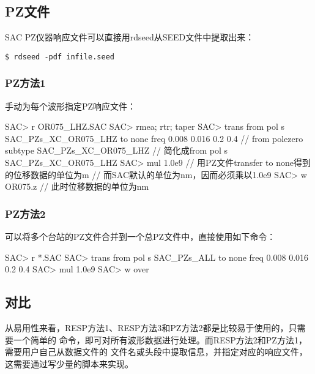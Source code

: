 \subsection{PZ文件}
SAC PZ仪器响应文件可以直接用rdseed从SEED文件中提取出来：
\begin{verbatim}
$ rdseed -pdf infile.seed
\end{verbatim}

\subsubsection{PZ方法1}
手动为每个波形指定PZ响应文件：
\begin{SACCode}
SAC> r OR075_LHZ.SAC
SAC> rmea; rtr; taper
SAC> trans from pol s SAC_PZs_XC_OR075_LHZ to none freq 0.008 0.016 0.2 0.4
    // from polezero subtype SAC_PZs_XC_OR075_LHZ
    // 简化成from pol s SAC_PZs_XC_OR075_LHZ
SAC> mul 1.0e9      // 用PZ文件transfer to none得到的位移数据的单位为m
                    // 而SAC默认的单位为nm，因而必须乘以1.0e9
SAC> w OR075.z      // 此时位移数据的单位为nm
\end{SACCode}

\subsubsection{PZ方法2}
可以将多个台站的PZ文件合并到一个总PZ文件中，直接使用如下命令：
\begin{SACCode}
SAC> r *.SAC
SAC> trans from pol s SAC_PZs_ALL to none freq 0.008 0.016 0.2 0.4
SAC> mul 1.0e9
SAC> w over
\end{SACCode}

\subsection{对比}
从易用性来看，RESP方法1、RESP方法3和PZ方法2都是比较易于使用的，只需要一个简单的
命令，即可对所有波形数据进行处理。而RESP方法2和PZ方法1，需要用户自己从数据文件的
文件名或头段中提取信息，并指定对应的响应文件，这需要通过写少量的脚本来实现。

